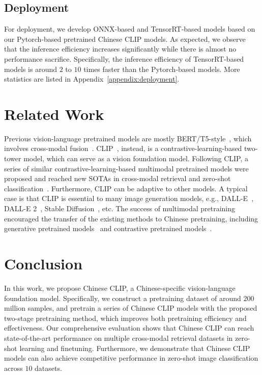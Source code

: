 \documentclass[11pt]{article}
\begin{document}
\subsection{Deployment}
For deployment, we develop ONNX-based and TensorRT-based models based on our Pytorch-based pretrained Chinese CLIP models. 
As expected, we observe that the inference efficiency increases significantly while there is almost no performance sacrifice. 
Specifically, the inference efficiency of TensorRT-based models is around $2$ to $10$ times faster than the Pytorch-based models. More statistics are listed in Appendix~\ref{appendix:deployment}.  
\section{Related Work}


Previous vision-language pretrained models are mostly BERT/T5-style~\citep{bert, t5}, which involves cross-modal fusion~\citep{uniter, unicoder-vl, visualbert, vilbert, interbert, oscar, pixelbert, e2e-vlp, vinvl, clipvil, simvlm, ofa, albef, blip, mplug, vlmo, beit3}. 
CLIP~\citep{clip}, instead, is a contrastive-learning-based two-tower model, which can serve as a vision foundation model.  
Following CLIP, a series of similar contrastive-learning-based multimodal pretrained models were proposed and reached new SOTAs in cross-modal retrieval and zero-shot classification~\citep{align, filip, florence}. 
Furthermore, CLIP can be adaptive to other models. 
A typical case is that CLIP is essential to many image generation models, e.g., DALL-E~\citep{dalle}, DALL-E 2~\citep{dalle2}, Stable Diffusion~\citep{latent_diffusion}, etc. 
The success of multimodal pretraining encouraged the transfer of the existing methods to Chinese pretraining, including generative pretrained models~\citep{m6, wenlan, m6-t, m6-10t, ofa} and contrastive pretrained models~\citep{wenlan, wukong, r2d2, altclip}. 


%
 



\section{Conclusion}
In this work, we propose Chinese CLIP, a Chinese-specific vision-language foundation model. 
Specifically, we construct a pretraining dataset of around $200$ million samples, and pretrain a series of Chinese CLIP models with the proposed two-stage pretraining method, which improves both pretraining efficiency and effectiveness. 
Our comprehensive evaluation shows that Chinese CLIP can reach state-of-the-art performance on multiple cross-modal retrieval datasets in zero-shot learning and finetuning. 
Furthermore, we demonstrate that Chinese CLIP models can also achieve competitive performance in zero-shot image classification across $10$ datasets. 
\end{document}
